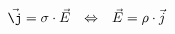 
\begin{align}
	\vec{\j} = \mathbf{\sigma} \cdot \vec{E} & & \Leftrightarrow & & \vec{E} = \mathbf{\rho} \cdot \vec{j}
	\label{eq:u2rho}
\end{align}